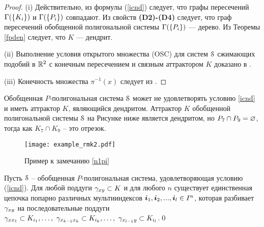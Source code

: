 \begin{proof}
(i) Действительно, из формулы (\ref{icnd}) следует, что графы пересечений $\Gamma(\{K_i\})$ и $\Gamma(\{P_i\})$ совпадают. 
Из свойств {\bf (D2)-(D4)} следует, что граф пересечений обобщенной полигональной системы  $\Gamma(\{P_i\})$ --- дерево. 
Из Теоремы \ref{fpden} следует, что $K$ --- дендрит.

(ii) Выполнение условия открытого множества (OSC) для систем ${\EuScript S}$ сжимающих подобий в $\mathbb{R}^2$ с конечным пересечением и связным аттрактором $K$ доказано в \cite{BR}.

(iii) Конечность множества $\pi^{-1}(x)$ следует из \cite[Proposition 2.3]{FPS}.
\end{proof}




\begin{remark}\label{n1pi}  
Обобщенная $P$-полигональная система ${\EuScript S}$ может не удовлетворять условию \ref{icnd} и иметь аттрактор $K$, являющийся дендритом. 
Аттрактор $K$ обобщенной полигональной системы ${\EuScript S}$ на Рисунке ниже является дендритом, но  $P_7\cap P_9=\varnothing$, тогда как $K_7\cap K_9$ -- это отрезок.
\end{remark}

\begin{figure}[H]
    \centering
    \texttt{[image: example\_rmk2.pdf]}
    \caption{Пример к замечанию \ref{n1pi}}
\label{img:rmk1}
\end{figure}

\begin{corollary}
Пусть ${\EuScript S}$ -- обобщенная $P$-полигональная система, удовлетворяющая условию (\ref{icnd}). Для любой поддуги $\gamma_{xy}\subset K$ и для любого $n$ существует единственная цепочка попарно различных мультииндексов ${\bm{i}}_1,{\bm{i}}_2,...,{\bm{i}}_l\in I^n$, которая разбивает $\gamma_{xy}$ на последовательные поддуги $\gamma_{xx_1}\subset K_{i_1},\ldots,\ \gamma_{x_{k-1}x_k}\subset K_{i_k},\ldots,\ \gamma_{x_{l-1}y}\subset K_{i_l}$.\qed
\end{corollary}


